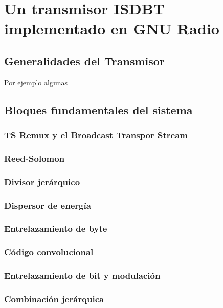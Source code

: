 \chapter{Un transmisor ISDBT implementado en GNU Radio}

\section{Generalidades del Transmisor}
Por ejemplo algunas
\section{Bloques fundamentales del sistema}

\subsection{TS Remux y el Broadcast Transpor Stream}

\subsection{Reed-Solomon}

\subsection{Divisor jerárquico}

\subsection{Dispersor de energía}

\subsection{Entrelazamiento de byte}

\subsection{Código convolucional}

\subsection{Entrelazamiento de bit y modulación}

\subsection{Combinación jerárquica}

